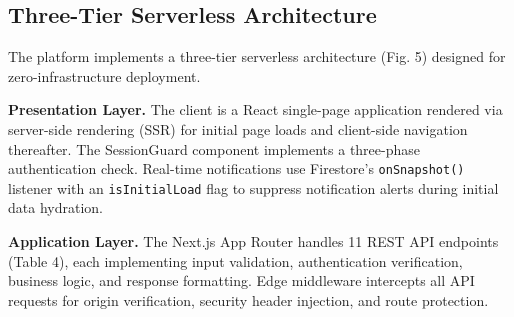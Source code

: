 \documentclass[12pt,a4paper]{article}
\begin{document}
\subsection{Three-Tier Serverless Architecture}

The platform implements a three-tier serverless architecture (Fig. 5) designed for zero-infrastructure deployment.

\begin{figure}[H]
\centering
{}
\end{figure}

\textbf{Presentation Layer.} The client is a React single-page application rendered via server-side rendering (SSR) for initial page loads and client-side navigation thereafter. The SessionGuard component implements a three-phase authentication check. Real-time notifications use Firestore's \texttt{onSnapshot()} listener with an \texttt{isInitialLoad} flag to suppress notification alerts during initial data hydration.

\textbf{Application Layer.} The Next.js App Router handles 11 REST API endpoints (Table 4), each implementing input validation, authentication verification, business logic, and response formatting. Edge middleware intercepts all API requests for origin verification, security header injection, and route protection.
\end{document}
